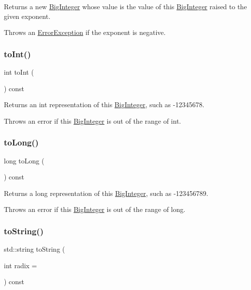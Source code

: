 Returns a new \mbox{\hyperlink{classBigInteger}{Big\+Integer}} whose value is the value of this \mbox{\hyperlink{classBigInteger}{Big\+Integer}} raised to the given exponent. 

Throws an \mbox{\hyperlink{classErrorException}{Error\+Exception}} if the exponent is negative. \mbox{\label{classBigInteger_a8cc7782de081ce702a9be163b4cb8f84}} 
\subsubsection{\texorpdfstring{to\+Int()}{toInt()}}
{\footnotesize\ttfamily int to\+Int (\begin{DoxyParamCaption}{ }\end{DoxyParamCaption}) const}



Returns an int representation of this \mbox{\hyperlink{classBigInteger}{Big\+Integer}}, such as -\/12345678. 

Throws an error if this \mbox{\hyperlink{classBigInteger}{Big\+Integer}} is out of the range of int. \mbox{\label{classBigInteger_aa762dbabd60643be2be9aa9eb14deddb}} 
\subsubsection{\texorpdfstring{to\+Long()}{toLong()}}
{\footnotesize\ttfamily long to\+Long (\begin{DoxyParamCaption}{ }\end{DoxyParamCaption}) const}



Returns a long representation of this \mbox{\hyperlink{classBigInteger}{Big\+Integer}}, such as -\/123456789. 

Throws an error if this \mbox{\hyperlink{classBigInteger}{Big\+Integer}} is out of the range of long. \mbox{\label{classBigInteger_a23af335cf9a414459a10205e2031c182}} 
\subsubsection{\texorpdfstring{to\+String()}{toString()}}
{\footnotesize\ttfamily std\+::string to\+String (\begin{DoxyParamCaption}\item[{int}]{radix = {} }\end{DoxyParamCaption}) const}



